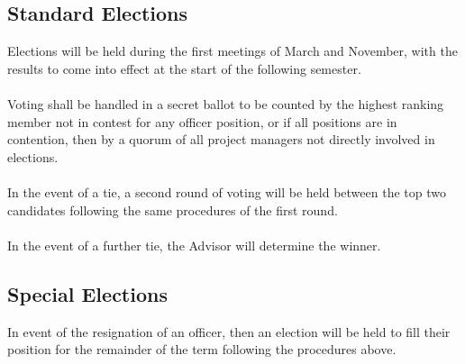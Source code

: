 \documentclass{article}
\begin{document}
  \subsection{Standard Elections}
  Elections will be held during the first meetings of March and 
  November, with the results to come into effect at the start 
  of the following semester.
  \\ \\
  Voting shall be handled in a secret ballot to be counted by the 
  highest ranking member not in contest for any officer position, or if
  all positions are in contention, then by a quorum of all project 
  managers not directly involved in elections.
  \\ \\
  In the event of a tie, a second round of voting will be held between 
  the top two candidates following the same procedures of the first 
  round.
  \\ \\
  In the event of a further tie, the Advisor will determine the winner.
  
  \subsection{Special Elections}
  In event of the resignation of an officer, then an election will be 
  held to fill their position for the remainder of the term following 
  the procedures above.
  
\end{document}
